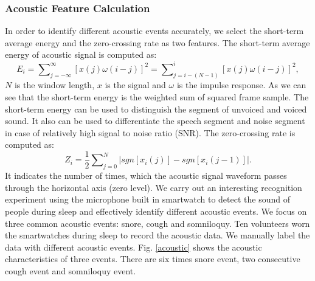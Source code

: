\subsubsection*{Acoustic Feature Calculation}
In order to identify different acoustic events accurately, we select the short-term average energy and the zero-crossing rate as two features. The short-term average energy of acoustic signal is computed as:
\begin{equation}
  E_i=\sum\nolimits_{j=-\infty}^{\infty}[x(j)\omega(i-j)]^2=\sum\nolimits_{j=i-(N-1)}^{i}[x(j)\omega(i-j)]^2,
\end{equation}
$N$ is the window length, $x$ is the signal and $\omega$ is the impulse response. As we can see that the short-term energy is the weighted sum of squared frame sample. The short-term energy can be used to distinguish the segment of unvoiced and voiced sound. It also can be used to differentiate the speech segment and noise segment  in  case of relatively high signal to noise ratio (SNR). The zero-crossing rate is computed as:
\begin{equation}
  Z_i = \frac{1}{2}\sum\nolimits_{j=0}^{N}|sgn[x_i(j)]-sgn[x_i(j-1)]|.
\end{equation}
It indicates the number of times, which the acoustic signal waveform passes through the horizontal axis (zero level). We carry out an interesting recognition experiment using the microphone built in smartwatch to detect the sound of people during sleep and effectively identify different acoustic events. We focus on three common acoustic events: snore, cough and somniloquy. Ten volunteers worn the smartwatches during sleep to record the acoustic data. We manually label the data with different acoustic events. Fig. \ref{acoustic} shows the acoustic characteristics of  three events. There are six times snore event, two consecutive cough event and somniloquy event.

